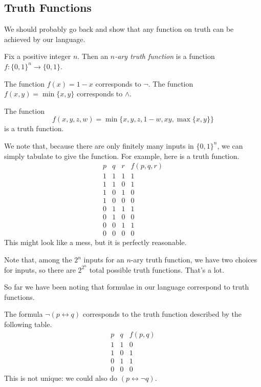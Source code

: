 \subsection{Truth Functions}
We should probably go back and show that any function on truth can be achieved by our language.
\begin{definition}
	Fix a positive integer $n$. Then an \textit{$n$-ary truth function} is a function $f:\{0,1\}^n\to\{0,1\}$.
\end{definition}
\begin{ex}
	The function $f(x)=1-x$ corresponds to $\lnot$. The function $f(x,y)=\min\{x,y\}$ corresponds to $\land$.
\end{ex}
\begin{example}
	The function
	\[f(x,y,z,w)=\min\{x,y,z,1-w,xy,\max\{x,y\}\}\]
	is a truth function.
\end{example}
We note that, because there are only finitely many inputs in $\{0,1\}^n$, we can simply tabulate to give the function. For example, here is a truth function.
\[\begin{array}{c|c|c||c}
	p & q & r & f(p,q,r) \\
	\hline
	1 & 1 & 1 & 1 \\
	1 & 1 & 0 & 1 \\
	1 & 0 & 1 & 0 \\
	1 & 0 & 0 & 0 \\
	0 & 1 & 1 & 1 \\
	0 & 1 & 0 & 0 \\
	0 & 0 & 1 & 1 \\
	0 & 0 & 0 & 0
\end{array}\]
This might look like a mess, but it is perfectly reasonable.
\begin{remark}
	Note that, among the $2^n$ inputs for an $n$-ary truth function, we have two choices for inputs, so there are $2^{2^n}$ total possible truth functions. That's a lot.
\end{remark}
So far we have been noting that formulae in our language correspond to truth functions.
\begin{ex}
	The formula $\lnot(p\leftrightarrow q)$ corresponds to the truth function described by the following table.
	\[\begin{array}{c|c||c}
		p & q & f(p,q) \\
		\hline
		1 & 1 & 0 \\
		1 & 0 & 1 \\
		0 & 1 & 1 \\
		0 & 0 & 0
	\end{array}\]
	This is not unique: we could also do $(p\leftrightarrow\lnot q)$.
\end{ex}
